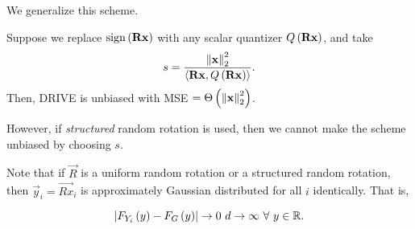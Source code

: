 \documentclass[twoside]{article}
\begin{document}
We generalize this scheme.

\begin{claim}
    Suppose we replace \(\mathrm{sign}\left(\boldsymbol{\mathbf{Rx}}\right)\) with any scalar quantizer
    \(Q\left(\boldsymbol{\mathbf{Rx}}\right)\), and take
    \begin{equation}
        s = \frac{\left\lVert\boldsymbol{\mathbf{x}}\right\rVert_2^2}{\langle\boldsymbol{\mathbf{Rx}},Q\left(\boldsymbol{\mathbf{Rx}}\right)\rangle}.
        \label{eq:sq-def}
    \end{equation}
    Then, DRIVE is unbiased with MSE \( = \Theta\left(\left\lVert\boldsymbol{\mathbf{x}}\right\rVert_2^2\right)\).
\end{claim}

However, if \emph{structured} random rotation is used, then we cannot make the
scheme unbiased by choosing \(s\).

Note that if \(\vec{R}\) is a uniform random rotation or a structured random
rotation, then \(\vec{y}_i = \vec{Rx}_i\) is approximately Gaussian distributed
for all \(i\) identically. That is,

\begin{equation}
    \abs{F_{Y_i}\brak{y}-F_G\brak{y}} \to 0\ d \to \infty\ \forall\ y \in \bR.
    \label{eq:y-gauss}
\end{equation}
\end{document}
